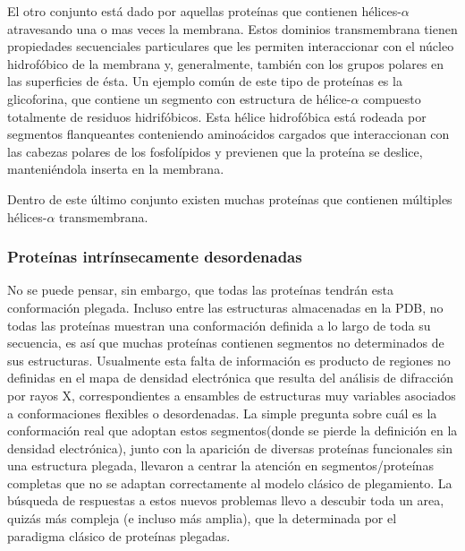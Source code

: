 El otro conjunto está dado por aquellas proteínas que contienen hélices-$\alpha$ atravesando una o mas veces la membrana. 
Estos dominios transmembrana tienen propiedades secuenciales particulares que les permiten interaccionar con el núcleo hidrofóbico de la membrana y, generalmente, también con los grupos polares en las superficies de ésta.
Un ejemplo común de este tipo de proteínas es la glicoforina, que contiene un segmento con estructura de hélice-$\alpha$ compuesto totalmente de residuos hidrifóbicos. 
Esta hélice hidrofóbica está rodeada por segmentos flanqueantes conteniendo aminoácidos cargados que interaccionan con las cabezas polares de los fosfolípidos y previenen que la proteína se deslice, manteniéndola inserta en la membrana.

Dentro de este último conjunto existen muchas proteínas que contienen múltiples hélices-$\alpha$ transmembrana.



\subsubsection{Proteínas intrínsecamente desordenadas}

No se puede pensar, sin embargo, que todas las proteínas tendrán esta conformación plegada.
Incluso entre las estructuras almacenadas en la PDB, no todas las proteínas muestran una conformación definida a lo largo de toda su secuencia, es así que muchas proteínas contienen segmentos no determinados de sus estructuras.
Usualmente esta falta de información es producto de regiones no definidas en el mapa de densidad electrónica que resulta del análisis de difracción por rayos X, 
correspondientes a ensambles de estructuras muy variables asociados a conformaciones flexibles o desordenadas. 
La simple pregunta sobre cuál es la conformación real que adoptan estos segmentos(donde se pierde la definición en la densidad electrónica), 
junto con la aparición de diversas proteínas funcionales sin una estructura plegada, 
llevaron a centrar la atención en 
segmentos/proteínas completas 
que no se adaptan correctamente al modelo clásico de plegamiento.
La búsqueda de respuestas a estos nuevos problemas llevo a descubir toda un area, quizás más compleja (e incluso más amplia), que la determinada por el paradigma clásico de proteínas plegadas.


